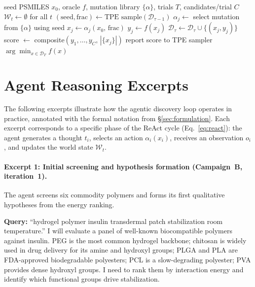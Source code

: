 \documentclass[twocolumn]{fairmeta}
\begin{document}
\begin{algorithm}[H]
\caption{Optuna TPE Polymer Search}\label{alg:optuna}
\small
\begin{algorithmic}[1]
\Require seed PSMILES $x_0$, oracle $f$, mutation library $\{\alpha\}$, trials $T$, candidates/trial $C$
\State $\mathcal{W}_t \gets \emptyset$ for all $t$ 
  \State $(\text{seed}, \text{frac}) \gets \text{TPE sample}(\mathcal{D}_{\tau-1})$ 
    \State $\alpha_j \gets$ select mutation from $\{\alpha\}$ using seed
    \State $x_j \gets \alpha_j(x_0,\, \text{frac})$
    \State $y_j \gets f(x_j)$ 
    \State $\mathcal{D}_\tau \gets \mathcal{D}_\tau \cup \{(x_j, y_j)\}$
  \EndFor
  \State score $\gets$ composite$(y_1,\ldots,y_C,\, |\{x_j\}|)$
  \State report score to TPE sampler
\EndFor
\State \Return $\arg\min_{x \in \mathcal{D}_T} f(x)$
\end{algorithmic}
\end{algorithm}

\section{Agent Reasoning Excerpts}
\label{app:reasoning}

The following excerpts illustrate how the agentic discovery loop operates in practice, annotated with the formal notation from \S\ref{sec:formulation}.
Each excerpt corresponds to a specific phase of the ReAct cycle (Eq.~\ref{eq:react}): the agent generates a thought $t_i$, selects an action $\alpha_i(x_i)$, receives an observation $o_i$, and updates the world state $\mathcal{W}_t$.

\paragraph{Excerpt 1: Initial screening and hypothesis formation (Campaign~B, iteration~1).}
The agent screens six commodity polymers and forms its first qualitative hypotheses from the energy ranking.

\begin{agentthought}
\scriptsize
\textbf{Query:} ``hydrogel polymer insulin transdermal patch stabilization room temperature.''
I will evaluate a panel of well-known biocompatible polymers against insulin.
PEG is the most common hydrogel backbone; chitosan is widely used in drug delivery for its amine and hydroxyl groups; PLGA and PLA are FDA-approved biodegradable polyesters; PCL is a slow-degrading polyester; PVA provides dense hydroxyl groups.
I need to rank them by interaction energy and identify which functional groups drive stabilization.
\end{agentthought}
\end{document}
